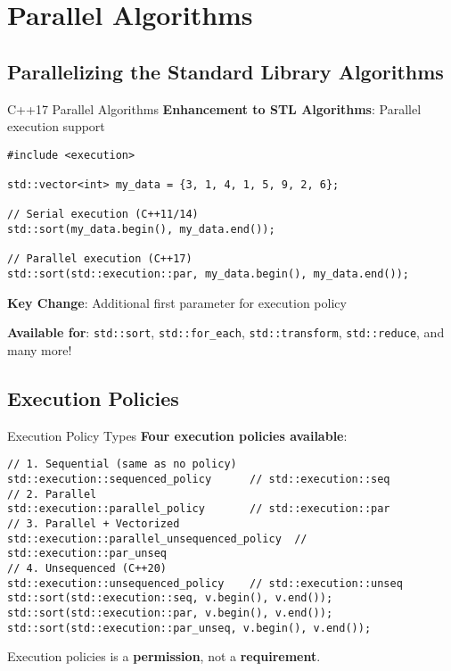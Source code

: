 \section{Parallel Algorithms}

\subsection{Parallelizing the Standard Library Algorithms}
\begin{frame}[fragile]{C++17 Parallel Algorithms}
	\textbf{Enhancement to STL Algorithms}: Parallel execution support

	\begin{verbatim}
#include <execution>

std::vector<int> my_data = {3, 1, 4, 1, 5, 9, 2, 6};

// Serial execution (C++11/14)
std::sort(my_data.begin(), my_data.end());

// Parallel execution (C++17)
std::sort(std::execution::par, my_data.begin(), my_data.end());
	\end{verbatim}

	\textbf{Key Change}: Additional first parameter for execution policy

	\vspace{0.5em}
	\textbf{Available for}: \texttt{std::sort}, \texttt{std::for\_each}, \texttt{std::transform}, \texttt{std::reduce}, and many more!
\end{frame}

\subsection{Execution Policies}
\begin{frame}[fragile]{Execution Policy Types}
	\textbf{Four execution policies available}:

	\begin{verbatim}
// 1. Sequential (same as no policy)
std::execution::sequenced_policy      // std::execution::seq
// 2. Parallel
std::execution::parallel_policy       // std::execution::par
// 3. Parallel + Vectorized
std::execution::parallel_unsequenced_policy  // std::execution::par_unseq
// 4. Unsequenced (C++20)
std::execution::unsequenced_policy    // std::execution::unseq
std::sort(std::execution::seq, v.begin(), v.end());
std::sort(std::execution::par, v.begin(), v.end());
std::sort(std::execution::par_unseq, v.begin(), v.end());
	\end{verbatim}

    Execution policies is a \textbf{permission}, not a \textbf{requirement}.
\end{frame}

